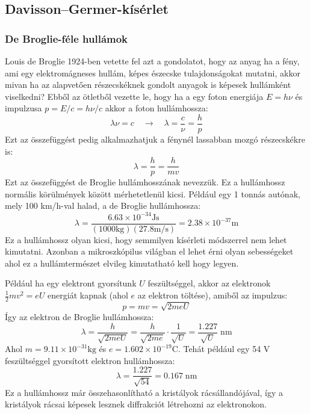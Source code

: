 \documentclass[../main.tex]{subfiles}
\begin{document}
\subsection{Davisson–Germer-kísérlet}
\subsubsection{De Broglie-féle hullámok}
Louis de Broglie 1924-ben vetette fel azt a gondolatot, hogy az anyag ha a fény, ami egy elektromágneses hullám, képes észecske tulajdonságokat mutatni, akkor mivan ha az alapvetően részecskéknek gondolt
anyagok is képesek hullámként viselkedni? Ebből az ötletből vezette le, hogy ha a egy foton energiája $E=h\nu$ és impulzusa $p=E/c=h\nu/c$ akkor a foton hullámhossza:
\begin{equation}
\lambda \nu = c \quad \rightarrow \quad \lambda = \frac{c}{\nu} = \frac{h}{p}
\end{equation}
Ezt az összefüggést pedig alkalmazhatjuk a fénynél lassabban mozgó részecskékre is:
\begin{equation}
\lambda = \frac{h}{p} = \frac{h}{mv}
\end{equation}
Ezt az összefüggést de Broglie hullámhosszának nevezzük. Ez a hullámhossz normális körülmények között mérhetetlenül kicsi. Például egy 1 tonnás autónak, mely 100 km/h-val halad, a de Broglie hullámhossza:
\begin{equation}
\lambda = \frac{6.63 \times 10^{-34} \mathrm{Js}}{(1000 \mathrm{kg})(27.8 \mathrm{m/s})} = 2.38 \times 10^{-37} \mathrm{m}
\end{equation}
Ez a hullámhossz olyan kicsi, hogy semmilyen kísérleti módszerrel nem lehet kimutatni. Azonban a mikroszkópilus világban el lehet érni olyan sebességeket ahol ez a hullámtermészet elvileg
kimutatható kell hogy legyen.

Például ha egy elektront gyorsítunk $U$ feszültséggel, akkor az elektronok $\frac{1}{2}mv^2 = eU$ energiát kapnak (ahol $e$ az elektron töltése), amiből az impulzus:
\begin{equation}
p = mv = \sqrt{2meU}
\end{equation}
Így az elektron de Broglie hullámhossza:
\begin{equation}
\lambda = \frac{h}{\sqrt{2meU}} = \frac{h}{\sqrt{2me}} \cdot \frac{1}{\sqrt{U}} = \frac{1.227}{\sqrt{U}} \; \mathrm{nm}
\end{equation}
Ahol $m = 9.11 \times 10^{-31} \mathrm{kg}$ és $e = 1.602 \times 10^{-19} \mathrm{C}$. Tehát például egy 54 V feszültséggel gyorsított elektron hullámhossza:
\begin{equation}
\lambda = \frac{1.227}{\sqrt{54}} = 0.167 \; \mathrm{nm}
\end{equation}
Ez a hullámhossz már összehasonlítható a kristályok rácsállandójával, így a kristályok rácsai képesek lesznek diffrakciót létrehozni az elektronokon.
\end{document}
